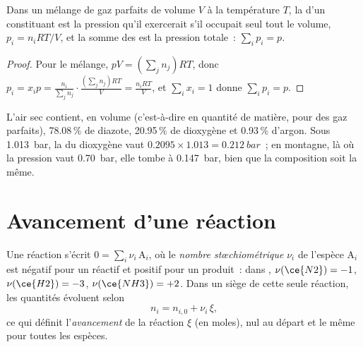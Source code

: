 \begin{proposition}\label{prop:b1:extent-q-and-k:dalton}
Dans un mélange de gaz parfaits de volume $V$ à la température $T$, la
 d'un constituant est la pression qu'il exercerait
s'il occupait seul tout le volume, $p_i = n_iRT/V$, et la somme des
 est la pression totale~: $\sum_i p_i = p$.
\end{proposition}

\begin{proof}
Pour le mélange, $pV = (\sum_j n_j)RT$, donc $p_i = x_i p = \frac{n_i}{\sum_j
n_j}\cdot\frac{(\sum_j n_j)RT}{V} = \frac{n_iRT}{V}$, et $\sum_i x_i = 1$
donne $\sum_i p_i = p$.
\end{proof}

\begin{example}[L'air]\label{ex:b1:extent-q-and-k:air}
L'air sec contient, en volume (c'est-à-dire en quantité de matière, pour
des gaz parfaits), 78.08\,\% de diazote, 20.95\,\% de dioxygène et
0.93\,\% d'argon. Sous \qty{1.013}{bar}, la  du
dioxygène vaut $0.2095 \times
1.013 = \qty{0.212}{bar}$~; en montagne, là où la pression vaut
\qty{0.70}{bar}, elle tombe à \qty{0.147}{bar}, bien que la composition
soit la même.
\end{example}

\section{Avancement d'une réaction}

\begin{definition}\label{def:b1:extent-q-and-k:extent}
Une réaction s'écrit $0 = \sum_i \nu_i\,\mathrm{A}_i$, où le
\emph{nombre stœchiométrique} $\nu_i$ de l'espèce
$\mathrm{A}_i$ est négatif pour un réactif et positif pour un produit~:
dans , $\nu(\ce{N2}) = -1$, $\nu(\ce{H2}) = -3$,
$\nu(\ce{NH3}) = +2$. Dans un  siège de cette seule
réaction, les quantités évoluent selon
\[
  n_i = n_{i,0} + \nu_i\,\xi ,
\]
ce qui définit l'\emph{avancement} de la réaction
$\xi$ (en moles), nul au départ et le même pour toutes les espèces.
\end{definition}

